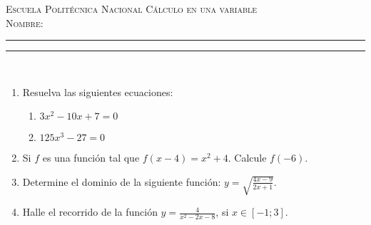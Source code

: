 \documentclass[11pt,a4paper,oneside]{article}\usepackage[]{graphicx}\usepackage[]{color}
\begin{document}
\thispagestyle{empty}
{\sf
{\Large \scshape Escuela Polit\'{e}cnica Nacional} \hfill {\scshape C\'{a}lculo en una variable}\\[7mm]
{\scshape Nombre:} \rule{0.6\textwidth}{0.5pt} \rule{0.1\textwidth}{0.5pt}\\
}











\begin{enumerate}
      \item Resuelva las siguientes ecuaciones:
\begin{enumerate}
  \item $3x^2 -10x+7=0$\\[15mm]
  \item $125x^3 -27=0$\\[15mm]
\end{enumerate}
      
      \item Si $f$ es una funci\'{o}n tal que $f(x-4)=x^2+4$. Calcule $f(-6)$.\\[25mm]
      
      \item Determine el dominio de la siguiente funci\'{o}n: $y=\sqrt{\displaystyle\frac{4x-9}{2x+1}}$.\\[45mm]
      
      \item Halle el recorrido de la funci\'{o}n $y=\displaystyle\frac{4}{x^2-2x-8}$, si $x\in [-1; 3]$.\\[40mm]
      

\end{enumerate}
\end{document}
